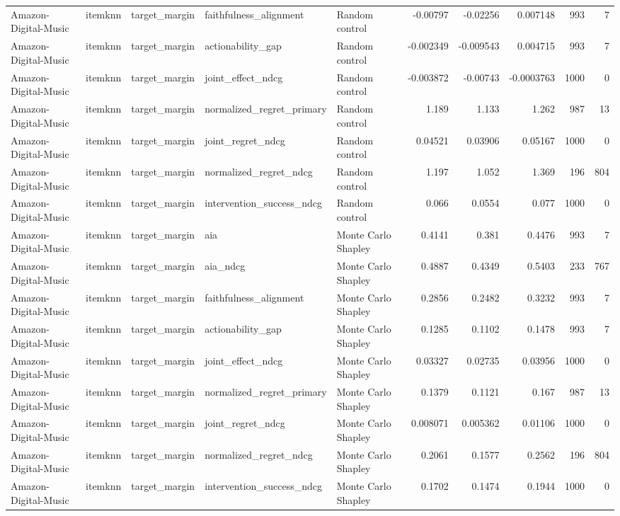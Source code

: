\begin{table}[t]
\begin{tabular}{lllllrrrrr}
Amazon-Digital-Music & itemknn & target\_margin & faithfulness\_alignment & Random control & -0.00797 & -0.02256 & 0.007148 & 993 & 7 \\
Amazon-Digital-Music & itemknn & target\_margin & actionability\_gap & Random control & -0.002349 & -0.009543 & 0.004715 & 993 & 7 \\
Amazon-Digital-Music & itemknn & target\_margin & joint\_effect\_ndcg & Random control & -0.003872 & -0.00743 & -0.0003763 & 1000 & 0 \\
Amazon-Digital-Music & itemknn & target\_margin & normalized\_regret\_primary & Random control & 1.189 & 1.133 & 1.262 & 987 & 13 \\
Amazon-Digital-Music & itemknn & target\_margin & joint\_regret\_ndcg & Random control & 0.04521 & 0.03906 & 0.05167 & 1000 & 0 \\
Amazon-Digital-Music & itemknn & target\_margin & normalized\_regret\_ndcg & Random control & 1.197 & 1.052 & 1.369 & 196 & 804 \\
Amazon-Digital-Music & itemknn & target\_margin & intervention\_success\_ndcg & Random control & 0.066 & 0.0554 & 0.077 & 1000 & 0 \\
Amazon-Digital-Music & itemknn & target\_margin & aia & Monte Carlo Shapley & 0.4141 & 0.381 & 0.4476 & 993 & 7 \\
Amazon-Digital-Music & itemknn & target\_margin & aia\_ndcg & Monte Carlo Shapley & 0.4887 & 0.4349 & 0.5403 & 233 & 767 \\
Amazon-Digital-Music & itemknn & target\_margin & faithfulness\_alignment & Monte Carlo Shapley & 0.2856 & 0.2482 & 0.3232 & 993 & 7 \\
Amazon-Digital-Music & itemknn & target\_margin & actionability\_gap & Monte Carlo Shapley & 0.1285 & 0.1102 & 0.1478 & 993 & 7 \\
Amazon-Digital-Music & itemknn & target\_margin & joint\_effect\_ndcg & Monte Carlo Shapley & 0.03327 & 0.02735 & 0.03956 & 1000 & 0 \\
Amazon-Digital-Music & itemknn & target\_margin & normalized\_regret\_primary & Monte Carlo Shapley & 0.1379 & 0.1121 & 0.167 & 987 & 13 \\
Amazon-Digital-Music & itemknn & target\_margin & joint\_regret\_ndcg & Monte Carlo Shapley & 0.008071 & 0.005362 & 0.01106 & 1000 & 0 \\
Amazon-Digital-Music & itemknn & target\_margin & normalized\_regret\_ndcg & Monte Carlo Shapley & 0.2061 & 0.1577 & 0.2562 & 196 & 804 \\
Amazon-Digital-Music & itemknn & target\_margin & intervention\_success\_ndcg & Monte Carlo Shapley & 0.1702 & 0.1474 & 0.1944 & 1000 & 0 \\

\end{tabular}
\end{table}
